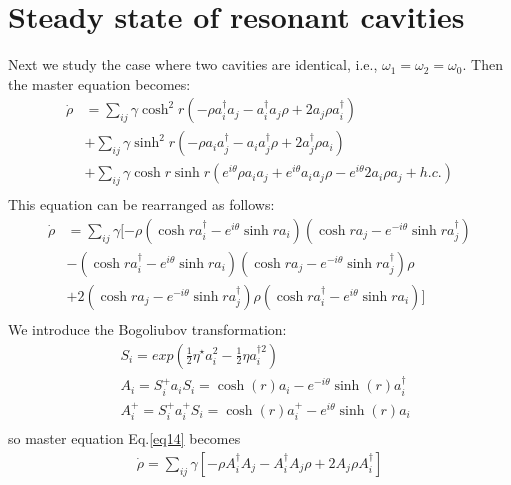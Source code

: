 \documentclass[aps,showpacs,onecolumn,twoside,groupedaddress]{revtex4}
\begin{document}
\section{Steady state of resonant cavities}
Next we study the case where two cavities are identical, i.e., $\omega_1=\omega_2=\omega_0$. Then the master equation becomes:
\begin{equation}
\label{eq13}
\begin{split}
\dot{\rho}&=\sum_{ij}\gamma\cosh^{2}r(-\rho a_{i}^{\dagger}a_{j}-a_{i}^{\dagger}a_{j}\rho+2a_{j}\rho a_{i}^{\dagger})\\
&+\sum_{ij}\gamma\sinh^{2}r(-\rho a_{i}a_{j}^{\dagger}-a_{i}a_{j}^{\dagger}\rho+2a_{j}^{\dagger}\rho a_{i})\\
&+\sum_{ij}\gamma\cosh r\sinh r(e^{i\theta}\rho a_{i}a_{j}+e^{i\theta}a_{i}a_{j}\rho-e^{i\theta}2a_{i}\rho a_{j}+h.c.)\\
\end{split}
\end{equation}
This equation can be rearranged as follows:
\begin{equation}
\label{eq14}
\begin{split}
\dot{\rho}&=\sum_{ij}\gamma[-\rho(\cosh ra_{i}^{\dagger}-e^{i\theta}\sinh ra_{i})(\cosh ra_{j}-e^{-i\theta}\sinh ra_{j}^{\dagger})\\
&-(\cosh ra_{i}^{\dagger}-e^{i\theta}\sinh ra_{i})(\cosh ra_{j}-e^{-i\theta}\sinh ra_{j}^{\dagger})\rho\\
&+2(\cosh ra_{j}-e^{-i\theta}\sinh ra_{j}^{\dagger})\rho(\cosh ra_{i}^{\dagger}-e^{i\theta}\sinh ra_{i})]\\
\end{split}
\end{equation}
We introduce the Bogoliubov transformation:
\begin{equation}
\label{eq15}
\begin{split}
&S_{i}=exp(\frac{1}{2}\eta^{\star}a_{i}^{2}-\frac{1}{2}\eta a_{i}^{\dagger2})\\
&A_{i}=S_{i}^{+}a_{i}S_{i}=\cosh(r)a_{i}-e^{-i\theta}\sinh(r)a_{i}^{\dagger} \\
&A_{i}^{+}=S_{i}^{+}a_{i}^{+}S_{i}=\cosh(r)a_{i}^{+}-e^{i\theta}\sinh(r)a_{i}\\
\end{split}
\end{equation}
so master equation Eq.\eqref{eq14} becomes
\begin{equation}
\label{eq16}
\begin{split}
\dot{\rho}=\sum_{ij}\gamma[-\rho A_{i}^{\dagger}A_{j}-A_{i}^{\dagger}A_{j}\rho+2A_{j}\rho A_{i}^{\dagger}]
\end{split}
\end{equation}
\end{document}
